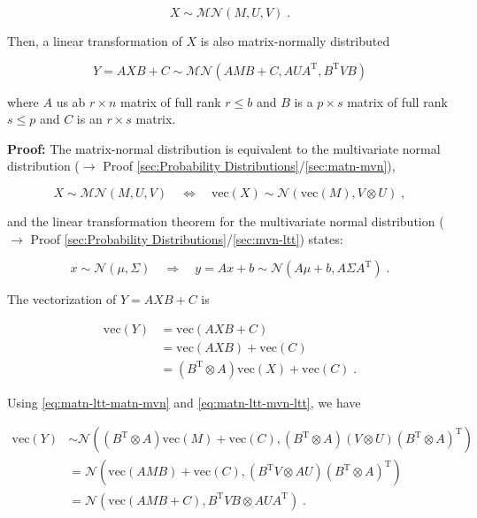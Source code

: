 \documentclass[a4paper,12pt,twoside]{book}
\begin{document}
\begin{equation} \label{eq:matn-ltt-matn}
X \sim \mathcal{MN}(M, U, V) \; .
\end{equation}

Then, a linear transformation of $X$ is also matrix-normally distributed

\begin{equation} \label{eq:matn-ltt-matn-trans}
Y = AXB + C \sim \mathcal{MN}(AMB+C, AUA^\mathrm{T}, B^\mathrm{T}VB)
\end{equation}

where $A$ us ab $r \times n$ matrix of full rank $r \leq b$ and $B$ is a $p \times s$ matrix of full rank $s \leq p$ and $C$ is an $r \times s$ matrix.


\vspace{1em}
\textbf{Proof:} The matrix-normal distribution is equivalent to the multivariate normal distribution ($\rightarrow$ Proof \ref{sec:Probability Distributions}/\ref{sec:matn-mvn}),

\begin{equation} \label{eq:matn-ltt-matn-mvn}
X \sim \mathcal{MN}(M, U, V) \quad \Leftrightarrow \quad \mathrm{vec}(X) \sim \mathcal{N}(\mathrm{vec}(M), V \otimes U) \; ,
\end{equation}

and the linear transformation theorem for the multivariate normal distribution ($\rightarrow$ Proof \ref{sec:Probability Distributions}/\ref{sec:mvn-ltt}) states:

\begin{equation} \label{eq:matn-ltt-mvn-ltt}
x \sim \mathcal{N}(\mu, \Sigma) \quad \Rightarrow \quad y = Ax + b \sim \mathcal{N}(A\mu + b, A \Sigma A^\mathrm{T}) \; .
\end{equation}

The vectorization of $Y = AXB + C$ is

\begin{equation} \label{eq:matn-ltt-vec-Y-s1}
\begin{split}
\mathrm{vec}(Y) &= \mathrm{vec}(AXB + C) \\
&= \mathrm{vec}(AXB) + \mathrm{vec}(C) \\
&= (B^\mathrm{T} \otimes A)\mathrm{vec}(X) + \mathrm{vec}(C) \; .
\end{split}
\end{equation}

Using \eqref{eq:matn-ltt-matn-mvn} and \eqref{eq:matn-ltt-mvn-ltt}, we have

\begin{equation} \label{eq:matn-ltt-vec-Y-s2}
\begin{split}
\mathrm{vec}(Y) &\sim \mathcal{N}((B^\mathrm{T} \otimes A) \mathrm{vec}(M) + \mathrm{vec}(C), (B^\mathrm{T} \otimes A) (V \otimes U) (B^\mathrm{T} \otimes A)^\mathrm{T}) \\
&= \mathcal{N}(\mathrm{vec}(AMB) + \mathrm{vec}(C), (B^\mathrm{T}V \otimes AU) (B^\mathrm{T} \otimes A)^\mathrm{T}) \\
&= \mathcal{N}(\mathrm{vec}(AMB + C), B^\mathrm{T}VB \otimes AUA^\mathrm{T}) \; .
\end{split}
\end{equation}
\end{document}
